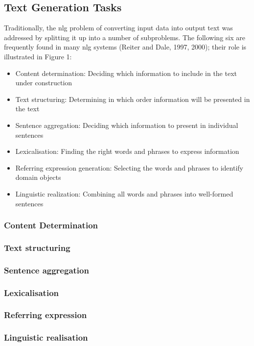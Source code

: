 \subsection{Text Generation Tasks}
Traditionally, the nlg problem of converting input data into output text was addressed by splitting it up into a number of subproblems. The following six are frequently found in many nlg systems (Reiter and Dale, 1997, 2000); their role is illustrated in Figure 1:
\begin{itemize}
	\item Content determination: Deciding which information to include in the text under construction
	\item Text structuring: Determining in which order information will be presented in the text
	\item Sentence aggregation: Deciding which information to present in individual sentences
	\item Lexicalisation: Finding the right words and phrases to express information
	\item Referring expression generation: Selecting the words and phrases to identify domain objects
	\item Linguistic realization: Combining all words and phrases into well-formed sentences
\end{itemize}

\subsubsection{Content Determination}
\subsubsection{Text structuring}
\subsubsection{Sentence aggregation}
\subsubsection{Lexicalisation}
\subsubsection{Referring expression}
\subsubsection{Linguistic realisation}


